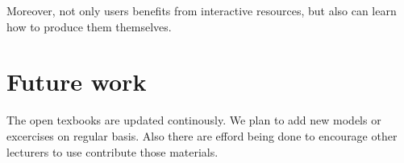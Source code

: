 \documentclass{deliverablereport}
\begin{document}
Moreover, not only users benefits from interactive resources, but also
can learn how to produce them themselves.


\section{Future work}

The open texbooks are updated continously. We plan to add new models
or excercises on regular basis. Also there are efford being done to
encourage other lecturers to use contribute those materials.
\end{document}
